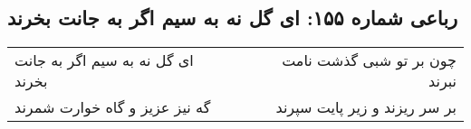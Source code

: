 \begin{center}
\section*{رباعی شماره ۱۵۵: ای گل نه به سیم اگر به جانت بخرند}
\label{sec:sh155}
\begin{longtable}{l p{0.5cm} r}
ای گل نه به سیم اگر به جانت بخرند
&&
چون بر تو شبی گذشت نامت نبرند
\\
گه نیز عزیز و گاه خوارت شمرند
&&
بر سر ریزند و زیر پایت سپرند
\\
\end{longtable}
\end{center}
